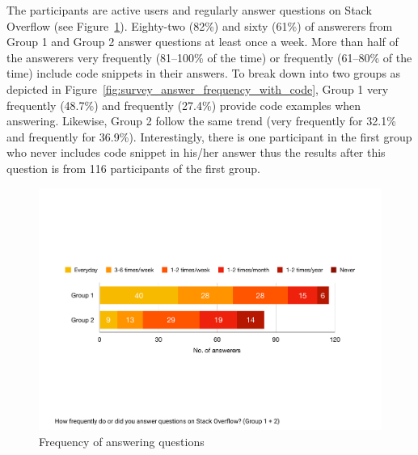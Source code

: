 \documentclass{svjour3}                     %
\begin{document}
The participants are active users and regularly answer questions on Stack
Overflow (see Figure~\ref{fig:survey_answer_frequency}). Eighty-two (82\%) and
sixty (61\%) of answerers from Group 1 and Group 2  answer questions at least
once a week. More than half of the answerers very frequently (81--100\% of the
time) or frequently (61--80\% of the time) include code snippets in their
answers. To break down into two groups as depicted in
Figure~\ref{fig:survey_answer_frequency_with_code}, Group 1 very frequently
(48.7\%) and frequently (27.4\%) provide code examples when answering. Likewise,
Group 2 follow the same trend (very frequently for 32.1\% and frequently for
36.9\%). Interestingly, there is one participant in the first group who never includes code snippet
in his/her answer thus the results after this question is from 116
participants of the first group.


\begin{figure}
		\centering
		\includegraphics[width=0.8\linewidth]{survey_answer_frequency}
		\caption{Frequency of answering questions}
		\label{fig:survey_answer_frequency}
\end{figure}

\end{document}
